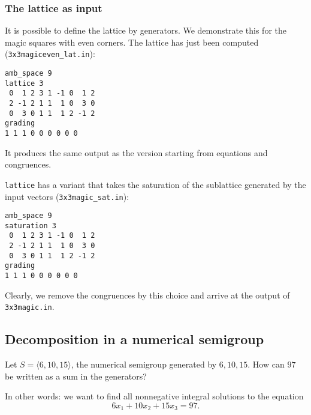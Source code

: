 \documentclass[12pt,a4paper]{scrartcl}
\theoremstyle{definition}
\begin{document}
\subsubsection{The lattice as input}\label{latt_ex}

It is possible to define the lattice by generators. We demonstrate this for the magic squares with even corners. The lattice has just been computed (\verb|3x3magiceven_lat.in|):

\begin{Verbatim}
amb_space 9
lattice 3
 0  1 2 3 1 -1 0  1 2
 2 -1 2 1 1  1 0  3 0
 0  3 0 1 1  1 2 -1 2
grading
1 1 1 0 0 0 0 0 0
\end{Verbatim}
It produces the same output as the version starting from equations and congruences.

\verb|lattice| has a variant that takes the saturation of the sublattice generated by the input vectors (\verb|3x3magic_sat.in|):

\begin{Verbatim}
amb_space 9
saturation 3
 0  1 2 3 1 -1 0  1 2
 2 -1 2 1 1  1 0  3 0
 0  3 0 1 1  1 2 -1 2
grading
1 1 1 0 0 0 0 0 0
\end{Verbatim}
Clearly, we remove the congruences by this choice and arrive at the output of \verb|3x3magic.in|.

\subsection{Decomposition in a numerical semigroup}\label{inhom_eq_ex}

Let $S=\langle 6,10,15\rangle$, the numerical semigroup generated by $6,10,15$. How can $97$ be written as a sum in the generators?\medskip

In other words: we want to find all nonnegative integral solutions to the equation
$$
6x_1+10x_2+15x_3=97.
$$
\end{document}
